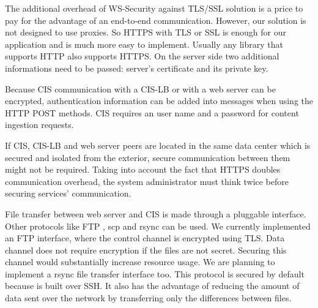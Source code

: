 The additional overhead of WS-Security against TLS/SSL solution is a price to pay for the advantage of an end-to-end communication. However, our solution is not designed to use proxies. So HTTPS with TLS or SSL is enough for our application and is much more easy to implement. Usually any library that supports HTTP also supports HTTPS. On the server side two additional informations need to be passed: server's certificate and its private key.

Because CIS communication with a CIS-LB or with a web server can be encrypted, authentication information can be added into messages when using the HTTP POST methods. CIS requires an user name and a password for content ingestion requests.

If CIS, CIS-LB and web server peers are located in the same data center which is secured and isolated from the exterior, secure communication between them might not be required. Taking into account the fact that HTTPS doubles communication overhead, the system administrator must think twice before securing services' communication.

File transfer between web server and CIS is made through a pluggable interface. Other protocols like FTP \cite{ftp}, scp \cite{scp} and rsync \cite{rsync} can be used. We currently implemented an FTP interface, where the control channel is encrypted using TLS. Data channel does not require encryption if the files are not secret. Securing this channel would substantially increase resource usage. We are planning to implement a rsync file transfer interface too. This protocol is secured by default because is built over SSH. It also has the advantage of reducing the amount of data sent over the network by transferring only the differences between files. 

